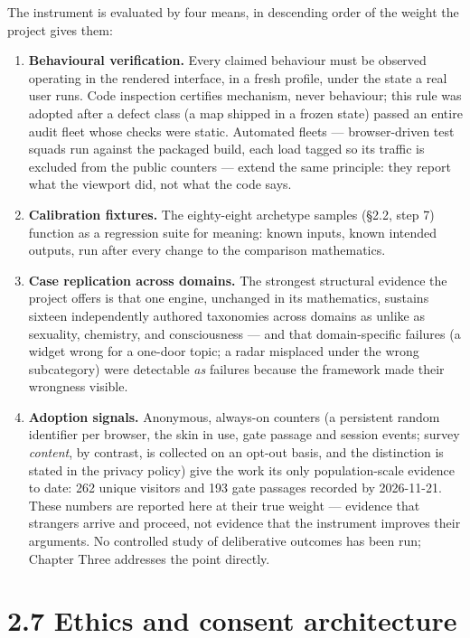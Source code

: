 The instrument is evaluated by four means, in descending order of the
weight the project gives them:

\begin{enumerate}
\def\labelenumi{\arabic{enumi}.}
\tightlist
\item
  \textbf{Behavioural verification.} Every claimed behaviour must be
  observed operating in the rendered interface, in a fresh profile,
  under the state a real user runs. Code inspection certifies mechanism,
  never behaviour; this rule was adopted after a defect class (a map
  shipped in a frozen state) passed an entire audit fleet whose checks
  were static. Automated fleets --- browser-driven test squads run
  against the packaged build, each load tagged so its traffic is
  excluded from the public counters --- extend the same principle: they
  report what the viewport did, not what the code says.
\item
  \textbf{Calibration fixtures.} The eighty-eight archetype samples
  (\S 2.2, step 7) function as a regression suite for meaning: known
  inputs, known intended outputs, run after every change to the
  comparison mathematics.
\item
  \textbf{Case replication across domains.} The strongest structural
  evidence the project offers is that one engine, unchanged in its
  mathematics, sustains sixteen independently authored taxonomies across
  domains as unlike as sexuality, chemistry, and consciousness --- and
  that domain-specific failures (a widget wrong for a one-door topic; a
  radar misplaced under the wrong subcategory) were detectable \emph{as}
  failures because the framework made their wrongness visible.
\item
  \textbf{Adoption signals.} Anonymous, always-on counters (a persistent
  random identifier per browser, the skin in use, gate passage and
  session events; survey \emph{content}, by contrast, is collected on an
  opt-out basis, and the distinction is stated in the privacy policy)
  give the work its only population-scale evidence to date: 262 unique
  visitors and 193 gate passages recorded by 2026-11-21. These numbers
  are reported here at their true weight --- evidence that strangers
  arrive and proceed, not evidence that the instrument improves their
  arguments. No controlled study of deliberative outcomes has been run;
  Chapter Three addresses the point directly.
\end{enumerate}

\section{2.7 Ethics and consent
architecture}\label{ethics-and-consent-architecture}

